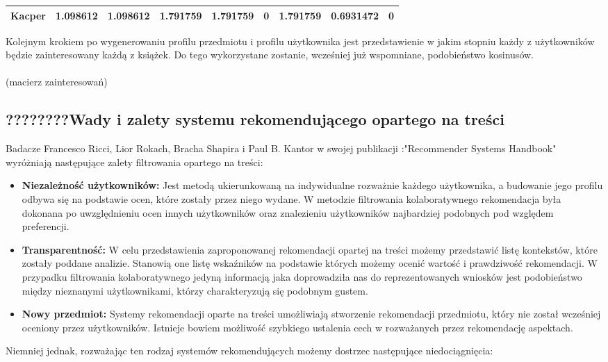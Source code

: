 \documentclass[12pt,a4paper]{report}
\begin{document}
{\begin{center}
{\begin{tabular}{|r|r|r|r|r|r|r|r|r|}
\hline
Kacper &  1.098612 &  1.098612 &  1.791759 &  1.791759 & 0 & 1.791759 & 0.6931472 & 0\\
\hline
\end{tabular}
}
\end{center}
Kolejnym krokiem po wygenerowaniu profilu przedmiotu i profilu użytkownika jest przedstawienie w jakim stopniu każdy z użytkowników będzie zainteresowany każdą z książek. Do tego wykorzystane zostanie, wcześniej już wspomniane, podobieństwo kosinusów.
\\
\\(macierz zainteresowań)
\\

\subsection{????????Wady i zalety systemu rekomendującego opartego na treści}
Badacze Francesco Ricci, Lior Rokach, Bracha Shapira i Paul B. Kantor w swojej publikacji :"Recommender Systems
Handbook" wyróżniają następujące zalety filtrowania opartego na treści: 
\begin{itemize}
\item \textbf{Niezależność użytkowników:} Jest metodą ukierunkowaną na indywidualne rozważnie każdego użytkownika, a budowanie jego profilu odbywa się na podstawie ocen, które zostały przez niego wydane. W metodzie filtrowania kolaboratywnego rekomendacja była dokonana po uwzględnieniu ocen innych użytkowników oraz znalezieniu użytkowników najbardziej podobnych pod względem preferencji.
\item \textbf{Transparentność:} W celu przedstawienia zaproponowanej rekomendacji opartej na treści możemy przedstawić listę kontekstów, które zostały poddane analizie. Stanowią one listę wskaźników na podstawie których możemy ocenić wartość i prawdziwość rekomendacji. W przypadku filtrowania kolaboratywnego jedyną informacją jaka doprowadziła nas do reprezentowanych wniosków jest podobieństwo między nieznanymi użytkownikami, którzy charakteryzują się podobnym gustem.
\item \textbf{Nowy przedmiot:} Systemy rekomendacji oparte na treści umożliwiają stworzenie rekomendacji przedmiotu, który nie został wcześniej oceniony przez użytkowników. Istnieje bowiem możliwość szybkiego ustalenia cech w rozważanych przez rekomendację aspektach. 
\end{itemize}
Niemniej jednak, rozważając ten rodzaj systemów rekomendujących możemy dostrzec następujące niedociągnięcia:
\begin{itemize}

\end{itemize}}
\end{document}
